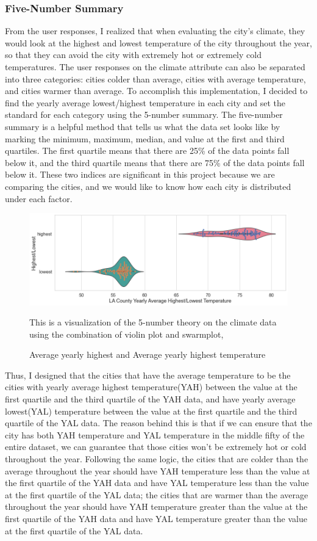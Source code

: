 \documentclass[10pt,twocolumn]{article}
\begin{document}
\subsubsection{Five-Number Summary}
\indent
From the user responses, I realized that when evaluating the city's climate, they would look at the highest and lowest temperature of the city throughout the year, so that they can avoid the city with extremely hot or extremely cold temperatures. The user responses on the climate attribute can also be separated into three categories: cities colder than average, cities with average temperature, and cities warmer than average. To accomplish this implementation, I decided to find the yearly average lowest/highest temperature in each city and set the standard for each category using the 5-number summary. The five-number summary is a helpful method that tells us what the data set looks like by marking the minimum, maximum, median, and value at the first and third quartiles. The first quartile means that there are 25\% of the data points fall below it, and the third quartile means that there are 75\% of the data points fall below it. These two indices are significant in this project because we are comparing the cities, and we would like to know how each city is distributed under each factor. 
\begin{figure}[h!]
    \centering
    \includegraphics[width=.95\linewidth]{climate.png}
    \caption{Average yearly highest and Average yearly highest temperature}
    \small
    This is a visualization of the 5-number theory on the climate data using the combination of violin plot and swarmplot,
\end{figure}
\indent
Thus, I designed that the cities that have the average temperature to be the cities with yearly average highest temperature(YAH) between the value at the first quartile and the third quartile of the YAH data, and have yearly average lowest(YAL) temperature between the value at the first quartile and the third quartile of the YAL data. The reason behind this is that if we can ensure that the city has both YAH temperature and YAL temperature in the middle fifty of the entire dataset, we can guarantee that those cities won't be extremely hot or cold throughout the year. Following the same logic, the cities that are colder than the average throughout the year should have YAH temperature less than the value at the first quartile of the YAH data and have YAL temperature less than the value at the first quartile of the YAL data; the cities that are warmer than the average throughout the year should have YAH temperature greater than the value at the first quartile of the YAH data and have YAL temperature greater than the value at the first quartile of the YAL data.
\end{document}
